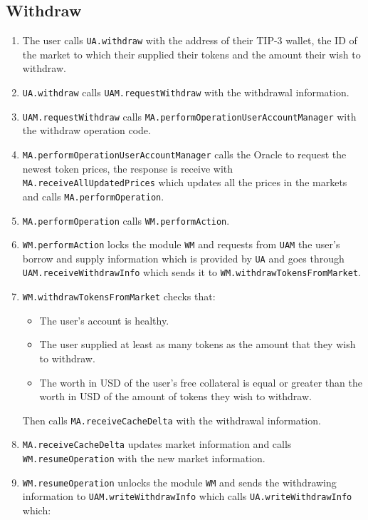 \subsection{Withdraw}
\begin{enumerate}
  \item The user calls \verb|UA.withdraw| with the address of their TIP-3 wallet, the ID of the market to which their supplied their tokens and the amount their wish to withdraw.
  \item \verb|UA.withdraw| calls \verb|UAM.requestWithdraw| with the withdrawal information.
  \item \verb|UAM.requestWithdraw| calls \verb|MA.performOperationUserAccountManager| with the withdraw operation code.
  \item \verb|MA.performOperationUserAccountManager| calls the Oracle to request the newest token prices, the response is receive with \verb|MA.receiveAllUpdatedPrices| which updates all the prices in the markets and calls \verb|MA.performOperation|.
  \item \verb|MA.performOperation| calls \verb|WM.performAction|.
  \item \verb|WM.performAction| locks the module \verb|WM| and requests from \verb|UAM| the user's borrow and supply information which is provided by \verb|UA| and goes through \verb|UAM.receiveWithdrawInfo| which sends it to \verb|WM.withdrawTokensFromMarket|.
  \item \verb|WM.withdrawTokensFromMarket| checks that:
  \begin{itemize}
    \item The user's account is healthy.
    \item The user supplied at least as many tokens as the amount that they wish to withdraw.
    \item The worth in USD of the user's free collateral is equal or greater than the worth in USD of the amount of tokens they wish to withdraw.
  \end{itemize}
  Then calls \verb|MA.receiveCacheDelta| with the withdrawal information.
  \item \verb|MA.receiveCacheDelta| updates market information and calls \verb|WM.resumeOperation| with the new market information.
  \item \verb|WM.resumeOperation| unlocks the module \verb|WM| and sends the withdrawing information to \verb|UAM.writeWithdrawInfo| which calls \verb|UA.writeWithdrawInfo| which:
  \begin{enumerate}[label*=\arabic*.]

\end{enumerate}
\end{enumerate}
